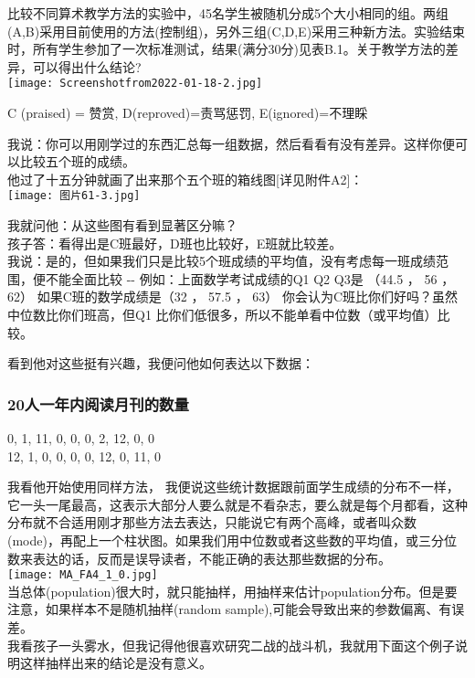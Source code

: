比较不同算术教学方法的实验中，45名学生被随机分成5个大小相同的组。两组(A,B)采用目前使用的方法(控制组)，另外三组(C,D,E)采用三种新方法。实验结束时，所有学生参加了一次标准测试，结果(满分30分)见表B.1。关于教学方法的差异，可以得出什么结论?\\

\texttt{[image: Screenshotfrom2022-01-18-2.jpg]}


C (praised) = 赞赏, D(reproved)=责骂惩罚, E(ignored)=不理睬

我说：你可以用刚学过的东西汇总每一组数据，然后看看有没有差异。这样你便可以比较五个班的成绩。\\
他过了十五分钟就画了出来那个五个班的箱线图{[}详见附件A2{]}：\\

\texttt{[image: 图片61-3.jpg]}

我就问他：从这些图有看到显著区分嘛？\\
孩子答：看得出是C班最好，D班也比较好，E班就比较差。\\
我说：是的，但如果我们只是比较5个班成绩的平均值，没有考虑每一班成绩范围，便不能全面比较
-\/- 例如：上面数学考试成绩的Q1 Q2 Q3是 （44.5 ， 56 ， 62）
如果C班的数学成绩是（32 ， 57.5 ， 63）
你会认为C班比你们好吗？虽然中位数比你们班高，但Q1
比你们低很多，所以不能单看中位数（或平均值）比较。

看到他对这些挺有兴趣，我便问他如何表达以下数据：\\

\hypertarget{ux4ebaux4e00ux5e74ux5185ux9605ux8bfbux6708ux520aux7684ux6570ux91cf}{%
\subsubsection{20人一年内阅读月刊的数量}\label{ux4ebaux4e00ux5e74ux5185ux9605ux8bfbux6708ux520aux7684ux6570ux91cf}}

0, 1, 11, 0, 0, 0, 2, 12, 0, 0\\
12, 1, 0, 0, 0, 0, 12, 0, 11, 0

我看他开始使用同样方法，
我便说这些统计数据跟前面学生成绩的分布不一样，它一头一尾最高，这表示大部分人要么就是不看杂志，要么就是每个月都看，这种分布就不合适用刚才那些方法去表达，只能说它有两个高峰，或者叫众数(mode)，再配上一个柱状图。如果我们用中位数或者这些数的平均值，或三分位数来表达的话，反而是误导读者，不能正确的表达那些数据的分布。\\

\texttt{[image: MA\_FA4\_1\_0.jpg]}\\
当总体(population)很大时，就只能抽样，用抽样来估计population分布。但是要注意，如果样本不是随机抽样(random
sample),可能会导致出来的参数偏离、有误差。\\
我看孩子一头雾水，但我记得他很喜欢研究二战的战斗机，我就用下面这个例子说明这样抽样出来的结论是没有意义。\\

